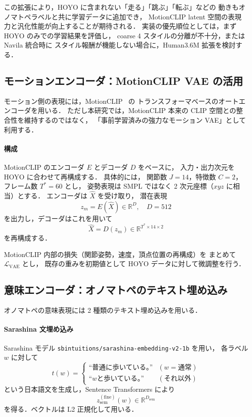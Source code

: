 \documentclass[a4paper,10pt]{jsarticle}
\begin{document}
この拡張により，HOYO に含まれない「走る」「跳ぶ」「転ぶ」などの
動きもオノマトペラベルと共に学習データに追加でき，
MotionCLIP latent 空間の表現力と汎化性能が向上することが期待される．
実装の優先順位としては，まず HOYO のみでの学習結果を評価し，
coarse 4 スタイルの分離が不十分，または Navila 統合時に
スタイル報酬が機能しない場合に，Human3.6M 拡張を検討する．

\subsection{モーションエンコーダ：MotionCLIP VAE の活用}

モーション側の表現には，MotionCLIP~\cite{motionclip} の
トランスフォーマベースのオートエンコーダを用いる．
ただし本研究では，MotionCLIP 本来の CLIP 空間との整合性を維持するのではなく，
「事前学習済みの強力なモーション VAE」として利用する．

\paragraph{構成}
MotionCLIP のエンコーダ $E$ とデコーダ $D$ をベースに，
入力・出力次元を HOYO に合わせて再構成する．
具体的には，
関節数 $J=14$，特徴数 $C=2$，フレーム数 $T^\ast=60$ とし，
姿勢表現は SMPL ではなく 2 次元座標（$xyz$ に相当）とする．
エンコーダは $\hat{X}$ を受け取り，
潜在表現
\[
z_m = E(\hat{X}) \in \mathbb{R}^{D},\quad D=512
\]
を出力し，デコーダはこれを用いて
\[
\widehat{X} = D(z_m) \in \mathbb{R}^{T^\ast \times 14 \times 2}
\]
を再構成する．

MotionCLIP 内部の損失（関節姿勢，速度，頂点位置の再構成）を
まとめて $\mathcal{L}_{\mathrm{VAE}}$ とし，
既存の重みを初期値として HOYO データに対して微調整を行う．

\subsection{意味エンコーダ：オノマトペのテキスト埋め込み}

オノマトペの意味表現には 2 種類のテキスト埋め込みを用いる．

\paragraph{Sarashina 文埋め込み}
Sarashina モデル \texttt{sbintuitions/sarashina-embedding-v2-1b} を用い，
各ラベル $w$ に対して
\[
t(w) =
\begin{cases}
\text{``普通に歩いている。''} & (w = \text{通常}) \\
\text{``}w\text{と歩いている。''} & (\text{それ以外})
\end{cases}
\]
という日本語文を生成し，Sentence Transformers により
\[
z_{\mathrm{sem}}^{(\mathrm{fine})}(w) \in \mathbb{R}^{D_{\mathrm{sem}}}
\]
を得る．ベクトルは L2 正規化して用いる．
\end{document}
